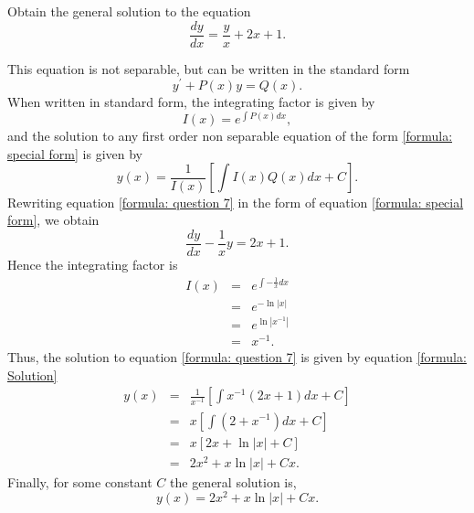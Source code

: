 \documentclass[11pt]{article}
\begin{document}
\begin{problem}
Obtain the general solution to the equation
\begin{equation}\label{formula: question 7}
      \dfrac{ dy }{dx} = \frac{y }{x} + 2 x + 1.
\end{equation}
\end{problem}
\begin{solution}
This equation is not separable, but can be written in the standard form
\begin{equation}\label{formula: special form}
y^{\prime} + P(x) y = Q(x).
\end{equation}
When written in standard form, the integrating factor is given by
\begin{equation}\label{formula: Integrating factor}
I(x) = e^{\int P(x) dx},
\end{equation}
and the solution to any first order non separable equation of the form \eqref{formula: special form} is given by
\begin{equation}\label{formula: Solution}
y(x) = \frac{1}{I(x)} \left[ \int I(x) Q(x) dx + C \right].
\end{equation}
Rewriting equation \eqref{formula: question 7} in the form of equation \eqref{formula: special form}, we obtain
\begin{equation*}
 \dfrac{ dy }{dx} - \frac{1 }{x} y   =  2 x + 1.
\end{equation*}
Hence the integrating factor is
\begin{eqnarray*}
I(x) & = & e^{\int - \frac{1 }{x} dx} \\
& = & e^{-\ln|x|} \\
& = & e^{\ln|x^{-1}|} \\
& = & x^{-1}.
\end{eqnarray*}
Thus, the solution to equation \eqref{formula: question 7} is given by equation \eqref{formula: Solution}
\begin{eqnarray*}
y(x) & = & \frac{1}{x^{-1}} \left[ \int x^{-1} (2x+1) dx + C \right]\\
& = & x \left[ \int (2+x^{-1}) dx + C \right]\\
& = & x \left[ 2x + \ln|x| + C \right]\\
& = &  2x^2 + x\ln|x| + Cx.
\end{eqnarray*}
Finally, for some constant $C$ the general solution is,
\begin{equation*}
     \boxed{y(x) = 2x^2 + x\ln|x| + Cx }.
\end{equation*}
\end{solution}
\end{document}
